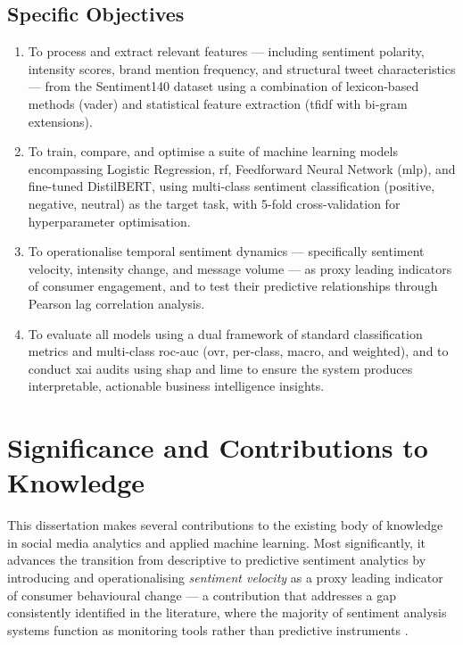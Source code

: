 \subsection*{Specific Objectives}
\begin{enumerate}
  \item To process and extract relevant features --- including sentiment polarity, intensity scores, brand mention frequency, and structural tweet characteristics --- from the Sentiment140 dataset using a combination of lexicon-based methods (\gls{vader}) and statistical feature extraction (\gls{tfidf} with bi-gram extensions).
  \item To train, compare, and optimise a suite of machine learning models encompassing Logistic Regression, \gls{rf}, Feedforward Neural Network (\gls{mlp}), and fine-tuned DistilBERT, using multi-class sentiment classification (positive, negative, neutral) as the target task, with 5-fold cross-validation for hyperparameter optimisation.
  \item To operationalise temporal sentiment dynamics --- specifically sentiment velocity, intensity change, and message volume --- as proxy leading indicators of consumer engagement, and to test their predictive relationships through Pearson lag correlation analysis.
  \item To evaluate all models using a dual framework of standard classification metrics and multi-class \gls{roc}-\gls{auc} (\gls{ovr}, per-class, macro, and weighted), and to conduct \gls{xai} audits using \gls{shap} and \gls{lime} to ensure the system produces interpretable, actionable business intelligence insights.
\end{enumerate}

\section{Significance and Contributions to Knowledge}

This dissertation makes several contributions to the existing body of knowledge in social media analytics and applied machine learning. Most significantly, it advances the transition from descriptive to predictive sentiment analytics by introducing and operationalising \emph{sentiment velocity} as a proxy leading indicator of consumer behavioural change --- a contribution that addresses a gap consistently identified in the literature, where the majority of sentiment analysis systems function as monitoring tools rather than predictive instruments \citep{bollen2011twitter}.

